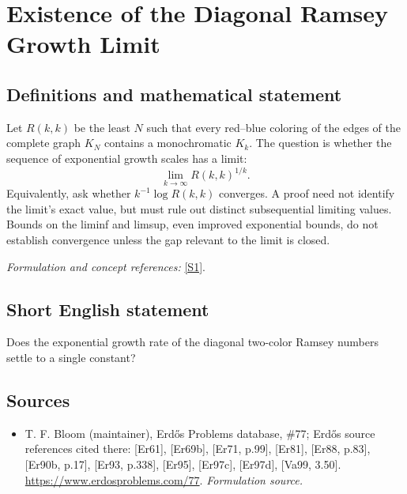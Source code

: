 \documentclass[11pt]{article}
\begin{document}
\section*{\texorpdfstring{Existence of the Diagonal Ramsey Growth Limit}{Existence of the Diagonal Ramsey Growth Limit}}\label{statement}
\subsection{Definitions and mathematical statement}
Let $R(k,k)$ be the least $N$ such that every red--blue coloring of the edges of the complete graph $K_N$ contains a monochromatic $K_k$. The question is whether the sequence of exponential growth scales has a limit:
\[
 \lim_{k\to\infty}R(k,k)^{1/k}.
\]
Equivalently, ask whether $k^{-1}\log R(k,k)$ converges. A proof need not identify the limit's exact value, but must rule out distinct subsequential limiting values. Bounds on the liminf and limsup, even improved exponential bounds, do not establish convergence unless the gap relevant to the limit is closed.
\par\smallskip\textit{Formulation and concept references:} \href{https://www.erdosproblems.com/77}{[S1]}.

\subsection{Short English statement}
Does the exponential growth rate of the diagonal two-color Ramsey numbers settle to a single constant?
\subsection{Sources}
\begin{itemize}
\item[S1]T. F. Bloom (maintainer), Erdős Problems database, \#77; Erdős source references cited there: [Er61], [Er69b], [Er71, p.99], [Er81], [Er88, p.83], [Er90b, p.17], [Er93, p.338], [Er95], [Er97c], [Er97d], [Va99, 3.50].
\url{https://www.erdosproblems.com/77}.
\textit{Formulation source.}
\end{itemize}
\end{document}
